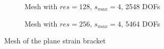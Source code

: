 \begin{figure}[H]\ContinuedFloat
    \begin{subfigure}[b]{1\linewidth}
        \centering
        \caption{Mesh with $res=128$, $s_{max}=4$, 2548 DOFs}
    \end{subfigure}
    \begin{subfigure}[b]{1\linewidth}
        \centering
        \caption{Mesh with $res=256$, $s_{max}=4$, 5464 DOFs}
    \end{subfigure}
    \caption[Mesh of the plane strain bracket]{Mesh of the plane strain bracket}
    \label{qdt_fig:ex_bracket_mesh_all}
\end{figure}

